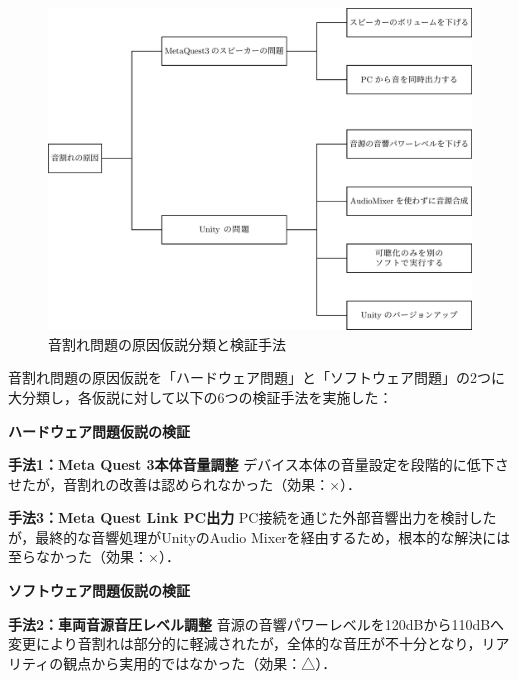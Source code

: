 \documentclass[10pt]{jsarticle}
\begin{document}

\begin{figure}[t]
\begin{center}
\includegraphics[width=0.9\linewidth]{pic/audio_distortion_flowchart.png}
\caption{音割れ問題の原因仮説分類と検証手法}
\label{fig:audio_distortion_solutions}
\end{center}
\end{figure}

音割れ問題の原因仮説を「ハードウェア問題」と「ソフトウェア問題」の2つに大分類し，各仮説に対して以下の6つの検証手法を実施した：

\textbf{ハードウェア問題仮説の検証}

\textbf{手法1：Meta Quest 3本体音量調整}
デバイス本体の音量設定を段階的に低下させたが，音割れの改善は認められなかった（効果：×）．

\textbf{手法3：Meta Quest Link PC出力}
PC接続を通じた外部音響出力を検討したが，最終的な音響処理がUnityのAudio Mixerを経由するため，根本的な解決には至らなかった（効果：×）．

\textbf{ソフトウェア問題仮説の検証}

\textbf{手法2：車両音源音圧レベル調整}
音源の音響パワーレベルを120dBから110dBへ変更により音割れは部分的に軽減されたが，全体的な音圧が不十分となり，リアリティの観点から実用的ではなかった（効果：△）．
\end{document}
